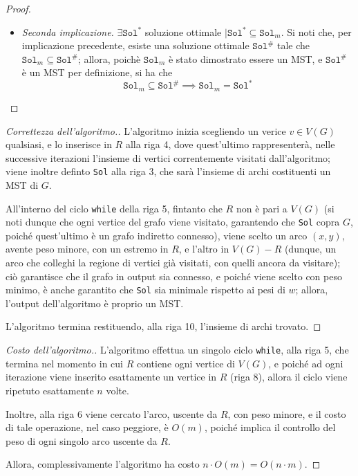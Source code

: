 \documentclass[a4paper, 12pt]{report}
\begin{document}
\begin{proof}
\begin{itemize}
            \item[] \textit{Seconda implicazione.} $\exists \texttt{Sol}^*$ soluzione ottimale $\mid \texttt{Sol}^* \subseteq \texttt{Sol}_m$. Si noti che, per implicazione precedente, esiste una soluzione ottimale $\texttt{Sol}^\#$ tale che $\texttt{Sol}_m \subseteq \texttt{Sol}^\#$; allora, poichè $\texttt{Sol}_m$ è stato dimostrato essere un MST, e $\texttt{Sol}^\#$ è un MST per definizione, si ha che $$\texttt{Sol}_m \subseteq \texttt{Sol}^\# \implies \texttt{Sol}_m = \texttt{Sol}^*$$
        \end{itemize}
    \end{proof}

    \begin{proof}[Correttezza dell'algoritmo.]
        L'algoritmo inizia scegliendo un verice $v \in V(G)$ qualsiasi, e lo inserisce in $R$ alla riga 4, dove quest'ultimo rappresenterà, nelle successive iterazioni l'insieme di vertici correntemente visitati dall'algoritmo; viene inoltre definto \texttt{Sol} alla riga 3, che sarà l'insieme di archi costituenti un MST di $G$.

        All'interno del ciclo \texttt{while} della riga 5, fintanto che $R$ non è pari a $V(G)$ (si noti dunque che ogni vertice del grafo viene visitato, garantendo che \texttt{Sol} copra $G$, poiché quest'ultimo è un grafo indiretto connesso), viene scelto un arco $(x, y)$, avente peso minore, con un estremo in $R$, e l'altro in $V(G) - R$ (dunque, un arco che colleghi la regione di vertici già visitati, con quelli ancora da visitare); ciò garantisce che il grafo in output sia connesso, e poiché viene scelto con peso minimo, è anche garantito che \texttt{Sol} sia minimale rispetto ai pesi di $w$; allora, l'output dell'algoritmo è proprio un MST.

        L'algoritmo termina restituendo, alla riga 10, l'insieme di archi trovato.
    \end{proof}

    \begin{proof}[Costo dell'algoritmo.]
        L'algoritmo effettua un singolo ciclo \texttt{while}, alla riga 5, che termina nel momento in cui $R$ contiene ogni vertice di $V(G)$, e poiché ad ogni iterazione viene inserito esattamente un vertice in $R$ (riga 8), allora il ciclo viene ripetuto esattamente $n$ volte.

        Inoltre, alla riga 6 viene cercato l'arco, uscente da $R$, con peso minore, e il costo di tale operazione, nel caso peggiore, è $O(m)$, poiché implica il controllo del peso di ogni singolo arco uscente da $R$.

        Allora, complessivamente l'algoritmo ha costo $n \cdot O(m) = O(n \cdot m)$.
    \end{proof}
\end{document}
